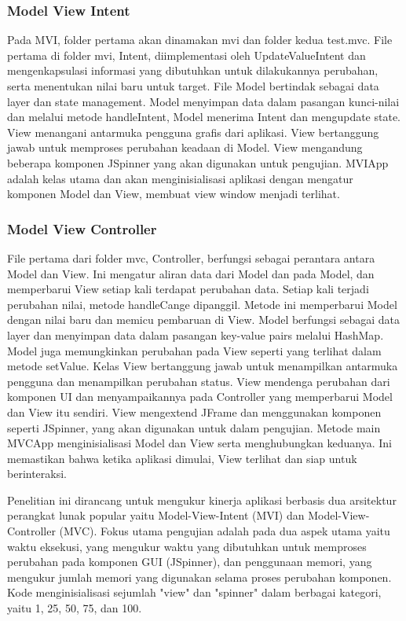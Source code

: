 \documentclass[conference]{IEEEtran}
\begin{document}
\subsubsection{Model View Intent}
Pada MVI, folder pertama akan dinamakan mvi dan folder kedua test.mvc. File pertama di folder mvi, Intent, diimplementasi oleh UpdateValueIntent dan mengenkapsulasi informasi yang dibutuhkan untuk dilakukannya perubahan, serta menentukan nilai baru untuk target. File Model bertindak sebagai data layer dan state management. Model menyimpan data dalam pasangan kunci-nilai dan melalui metode handleIntent, Model menerima Intent dan mengupdate state. View menangani antarmuka pengguna grafis dari aplikasi. View bertanggung jawab untuk memproses perubahan keadaan di Model. View mengandung beberapa komponen JSpinner yang akan digunakan untuk pengujian. MVIApp adalah kelas utama dan akan menginisialisasi aplikasi dengan mengatur komponen Model dan View, membuat view window menjadi terlihat.
\subsubsection{Model View Controller}
File pertama dari folder mvc, Controller, berfungsi sebagai perantara antara Model dan View. Ini mengatur aliran data dari Model dan pada Model, dan memperbarui View setiap kali terdapat perubahan data. Setiap kali terjadi perubahan nilai, metode handleCange dipanggil. Metode ini memperbarui Model dengan nilai baru dan memicu pembaruan di View. Model berfungsi sebagai data layer dan menyimpan data dalam pasangan key-value pairs melalui HashMap. Model juga memungkinkan perubahan pada View seperti yang terlihat dalam metode setValue. Kelas View bertanggung jawab untuk menampilkan antarmuka pengguna dan menampilkan perubahan status. View mendenga perubahan dari komponen UI dan menyampaikannya pada Controller yang memperbarui Model dan View itu sendiri. View mengextend JFrame dan menggunakan komponen seperti JSpinner, yang akan digunakan untuk dalam pengujian. Metode main MVCApp menginisialisasi Model dan View serta menghubungkan keduanya. Ini memastikan bahwa ketika aplikasi dimulai, View terlihat dan siap untuk berinteraksi.

Penelitian ini dirancang untuk mengukur kinerja aplikasi berbasis dua arsitektur perangkat lunak popular yaitu Model-View-Intent (MVI) dan Model-View-Controller (MVC). Fokus utama pengujian adalah pada dua aspek utama yaitu waktu eksekusi, yang mengukur waktu yang dibutuhkan untuk memproses perubahan pada komponen GUI (JSpinner), dan penggunaan memori, yang mengukur jumlah memori yang digunakan selama proses perubahan komponen. Kode menginisialisasi sejumlah "view" dan "spinner" dalam berbagai kategori, yaitu 1, 25, 50, 75, dan 100.
\end{document}
